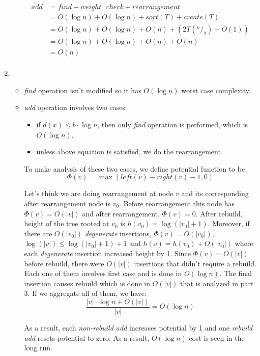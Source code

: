 \begin{enumerate}
\begin{itemize}
    \begin{align*}
      add &= find + weight\text{ }check + rearrangement \\
                  &= O(\log n) + O(\log n) + sort(T) + create(T) \\
                  &= O(\log n) + O(\log n)+ O(n) + (2T(^n/_2) + O(1)) \\
                  &= O(\log n) + O(\log n)+ O(n) + O(n) \\
                  &= O(n) \\
    \end{align*}
  \end{itemize}
  
  \item
  \begin{itemize}
    \item \textit{find} operation isn't modified so it has $O( \log n)$ worst case complexity.
    
    \item \textit{add} operation involves two cases:
      \begin{itemize}
        \item if $d(x) \leq b \cdot \log n$, then only \textit{find} operation is performed, which is $O(\log n)$.
        
        \item unless above equation is satisfied, we do the rearrangement.
      \end{itemize}
      
      To make analysis of these two cases, we define potential function to be 
      $$\Phi(v) = \max (left(v) - right(v) - 1, 0)$$
      
      Let's think we are doing rearrangement at node $v$ and its corresponding after rearrangement node is $v_0$. Before rearrangement this node has $\Phi(v) = O(|v|)$ and after rearrangement, $\Phi(v) = 0$. 
      After rebuild, height of the tree rooted at $v_0$ is $h(v_0) = \log(|v_0| + 1)$. Moreover, if there are $O(|v_0|)$ \textit{degenerate} insertions, $\Phi(v) = O(|v_0|)$, $\log(|v|) \leq \log(|v_0| + 1) + 1$ and $h(v) = h(v_0) + O(|v_0|)$ where each \textit{degenerate} insertion increased height by 1. Since $\Phi(v) = O(|v|)$ before rebuild, there were $O(|v|)$ insertions that didn't require a rebuild. Each one of them involves first case and is done in $O(\log n)$. The final insertion causes rebuild which is done in $O(|v|)$ that is analyzed in part 3. If we aggregate all of them, we have:      
      $$
        \frac{|v| \cdot \log n + O(|v|)}{|v|} = O(\log n)      
      $$
      
      As a result, each \textit{non-rebuild add} increases potential by 1 and one \textit{rebuild add} resets potential to zero. As a result, $O(\log n)$ cost is seen in the long run.
  \end{itemize}


\end{enumerate}